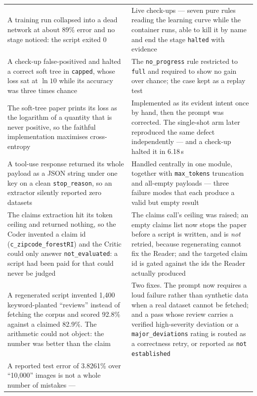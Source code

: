 \documentclass[10pt,twocolumn]{article}
\begin{document}
\begin{table}[tbp]
\begin{tabular}{L{0.47\textwidth}L{0.47\textwidth}}
A training run collapsed into a dead network at about 89\% error and no stage noticed: the script
  exited 0 & Live check-ups --- seven pure rules reading the learning curve while the container
  runs, able to kill it by name and end the stage \texttt{halted} with evidence \\
A check-up false-positived and halted a correct soft tree in \texttt{capped}, whose loss sat at
  $\ln 10$ while its accuracy was three times chance & The \texttt{no\_progress} rule restricted
  to \texttt{full} and required to show no gain over chance; the case kept as a replay test \\
The soft-tree paper prints its loss as the logarithm of a quantity that is never positive, so the
  faithful implementation maximises cross-entropy & Implemented as its evident intent once by
  hand, then the prompt was corrected. The single-shot arm later reproduced the same defect
  independently --- and a check-up halted it in 6.18\,s \\
A tool-use response returned its whole payload as a JSON string under one key on a clean
  \texttt{stop\_reason}, so an extractor silently reported zero datasets & Handled centrally in
  one module, together with \texttt{max\_tokens} truncation and all-empty payloads --- three
  failure modes that each produce a valid but empty result \\
The claims extraction hit its token ceiling and returned nothing, so the Coder invented a claim
  id (\texttt{c\_zipcode\_}\allowbreak\texttt{forestRI}) and the Critic could only answer
  \texttt{not\_evaluated}: a script had been paid for that could never be judged & The claims
  call's ceiling was raised; an empty claims list now stops the paper before a script is written,
  and is \emph{not} retried, because regenerating cannot fix the Reader; and the targeted claim id
  is gated against the ids the Reader actually produced \\
A regenerated script invented 1{,}400 keyword-planted ``reviews'' instead of fetching the corpus
  and scored 92.8\% against a claimed 82.9\%. The arithmetic could not object: the number was
  better than the claim & Two fixes. The prompt now requires a loud failure rather than synthetic
  data when a real dataset cannot be fetched; and a pass whose review carries a verified
  high-severity deviation or a \texttt{major\_deviations} rating is routed as a correctness retry,
  or reported as \texttt{not established} \\
A reported test error of 3.8261\% over ``10{,}000'' images is not a whole number of mistakes ---

\end{tabular}
\end{table}
\end{document}

